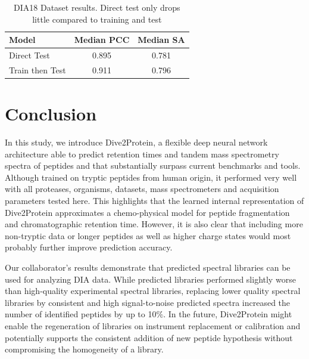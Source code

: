\documentclass[final]{cvpr}
\begin{document}
\begin{table}
   \begin{center}
   \begin{tabular}{|l|c|c|}
   \hline
   Model & Median PCC & Median SA \\
   \hline\hline
   Direct Test & 0.895 & 0.781 \\
   Train then Test & 0.911 & 0.796 \\
   \hline
   \end{tabular}
   \end{center}
   \caption{DIA18 Dataset results. Direct test only drops little compared to training and test}
   \label{table:DIA18_direct}
\end{table}
\section{Conclusion}

In this study, we introduce Dive2Protein, a flexible deep neural network architecture able to predict retention times and 
tandem mass spectrometry spectra of peptides and that substantially surpass current 
benchmarks and tools. Although trained on tryptic peptides from human origin, it performed very well with all proteases, 
organisms, datasets, mass spectrometers and acquisition parameters tested here. This highlights that the learned internal 
representation of Dive2Protein approximates a chemo-physical model for peptide fragmentation and chromatographic retention time. 
However, it is also clear that including more non-tryptic data or longer peptides as well as higher charge states would 
most probably further improve prediction accuracy.

Our collaborator's results demonstrate that predicted spectral libraries can be used for analyzing DIA data. While predicted 
libraries performed slightly worse than high-quality experimental spectral libraries, replacing lower quality 
spectral libraries by consistent and high signal-to-noise predicted spectra increased the number of identified 
peptides by up to 10$\%$. In the future, Dive2Protein might enable the regeneration of libraries on instrument replacement 
or calibration and potentially supports the consistent addition of new peptide hypothesis without compromising 
the homogeneity of a library.




{\small


}
\end{document}
